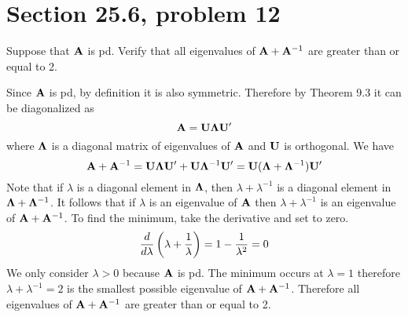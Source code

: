 \section{Section 25.6, problem 12}
Suppose that $\bf A$ is pd.
Verify that all eigenvalues of ${\bf A}+{\bf A}^{-1}$ are greater
than or equal to 2.

\bigskip
\noindent
Since $\bf A$ is pd, by definition it is also symmetric.
Therefore by Theorem 9.3 it can be diagonalized as
$${\bf A}={\bf U}{\bf\Lambda}{\bf U'}$$
where $\bf\Lambda$ is a diagonal matrix of eigenvalues of $\bf A$
and $\bf U$ is orthogonal.
We have
$${\bf A}+{\bf A}^{-1}={\bf U}{\bf\Lambda}{\bf U'}
+{\bf U}{\bf\Lambda}^{-1}{\bf U'}
={\bf U}({\bf\Lambda}+{\bf\Lambda}^{-1}){\bf U}'
$$
Note that if $\lambda$ is a diagonal element in $\bf\Lambda$,
then $\lambda+\lambda^{-1}$ is a diagonal element
in ${\bf\Lambda}+{\bf\Lambda}^{-1}$.
It follows that if $\lambda$ is an eigenvalue of $\bf A$ then
$\lambda+\lambda^{-1}$ is an eigenvalue of ${\bf A}+{\bf A}^{-1}$.
To find the minimum, take the derivative and set to zero.
$${d\over d\lambda}\left(\lambda+{1\over\lambda}\right)=
1-{1\over\lambda^2}=0$$
We only consider $\lambda>0$ because $\bf A$ is pd.
The minimum occurs at $\lambda=1$
therefore $\lambda+\lambda^{-1}=2$
is the smallest possible eigenvalue of ${\bf A}+{\bf A}^{-1}$.
Therefore all eigenvalues of ${\bf A}+{\bf A}^{-1}$ are greater
than or equal to 2.
